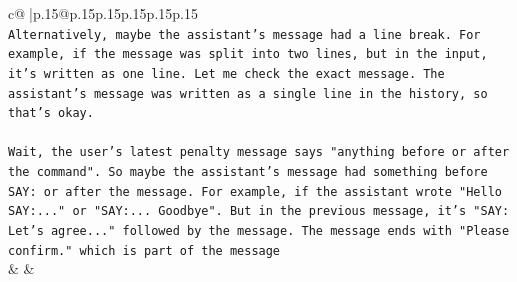 \documentclass{article}
\begin{document}
{\begin{supertabular}{c@{$\;$}|p{.15\linewidth}@{}p{.15\linewidth}p{.15\linewidth}p{.15\linewidth}p{.15\linewidth}p{.15\linewidth}}
{{{\\ 
\texttt{Alternatively, maybe the assistant's message had a line break. For example, if the message was split into two lines, but in the input, it's written as one line. Let me check the exact message. The assistant's message was written as a single line in the history, so that's okay.} \\
\\ 
\texttt{Wait, the user's latest penalty message says "anything before or after the command". So maybe the assistant's message had something before SAY: or after the message. For example, if the assistant wrote "Hello SAY:..." or "SAY:... Goodbye". But in the previous message, it's "SAY: Let's agree..." followed by the message. The message ends with "Please confirm." which is part of the message} \\
            }
        }
    }
    & & \\ \\


\end{supertabular}}
\end{document}
